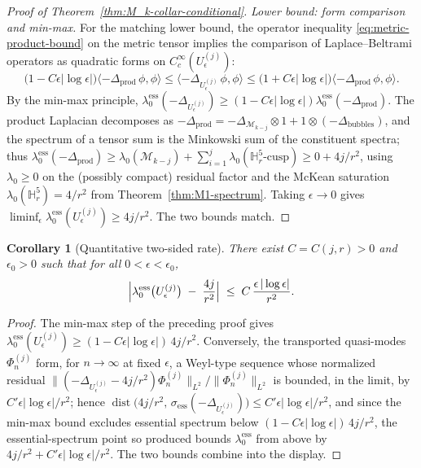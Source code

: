 \documentclass[11pt,letterpaper]{article}
\newtheorem{corollary}[theorem]{Corollary}
\theoremstyle{definition}
\newcommand{\bbH}{\mathbb{H}}
\newcommand{\cM}{\mathcal{M}}
\newcommand{\Lap}{\Delta}
\begin{document}
\begin{proof}[Proof of Theorem~\ref{thm:M_k-collar-conditional}]
\emph{Lower bound: form comparison and min-max.}
For the matching lower bound, the operator inequality \eqref{eq:metric-product-bound} on the metric tensor implies the comparison of Laplace--Beltrami operators as quadratic forms on $C_c^\infty(U_\epsilon^{(j)})$:
\[
\bigl(1 - C\epsilon|\log\epsilon|\bigr)\langle -\Lap_{\mathrm{prod}}\,\phi, \phi\rangle \le \langle -\Lap_{U_\epsilon^{(j)}}\,\phi, \phi\rangle \le \bigl(1 + C\epsilon|\log\epsilon|\bigr)\langle -\Lap_{\mathrm{prod}}\,\phi, \phi\rangle.
\]
By the min-max principle, $\lambda_0^{\mathrm{ess}}(-\Lap_{U_\epsilon^{(j)}}) \ge (1 - C\epsilon|\log\epsilon|)\lambda_0^{\mathrm{ess}}(-\Lap_{\mathrm{prod}})$. The product Laplacian decomposes as $-\Lap_{\mathrm{prod}} = -\Lap_{\cM_{k-j}} \otimes 1 + 1\otimes(-\Lap_{\mathrm{bubbles}})$, and the spectrum of a tensor sum is the Minkowski sum of the constituent spectra; thus $\lambda_0^{\mathrm{ess}}(-\Lap_{\mathrm{prod}}) \ge \lambda_0(\cM_{k-j}) + \sum_{i=1}^j \lambda_0(\bbH^5_r\text{-cusp}) \ge 0 + 4j/r^2$, using $\lambda_0 \ge 0$ on the (possibly compact) residual factor and the McKean saturation $\lambda_0(\bbH^5_r) = 4/r^2$ from Theorem~\ref{thm:M1-spectrum}. Taking $\epsilon \to 0$ gives $\liminf_\epsilon \lambda_0^{\mathrm{ess}}(U_\epsilon^{(j)}) \ge 4j/r^2$. The two bounds match.
\end{proof}

\begin{corollary}[Quantitative two-sided rate]\label{cor:rate}
There exist $C = C(j, r) > 0$ and $\epsilon_0 > 0$ such that for all $0 < \epsilon < \epsilon_0$,
\[
\Bigl|\lambda_0^{\mathrm{ess}}\bigl(U_\epsilon^{(j)}\bigr) \;-\; \frac{4j}{r^2}\Bigr| \;\le\; C\,\frac{\epsilon\,|\log\epsilon|}{r^2}.
\]
\end{corollary}

\begin{proof}
The min-max step of the preceding proof gives $\lambda_0^{\mathrm{ess}}(U_\epsilon^{(j)}) \ge (1 - C\epsilon|\log\epsilon|)\,4j/r^2$. Conversely, the transported quasi-modes $\Phi^{(j)}_n$ form, for $n \to \infty$ at fixed $\epsilon$, a Weyl-type sequence whose normalized residual $\|(-\Lap_{U_\epsilon^{(j)}} - 4j/r^2)\Phi^{(j)}_n\|_{L^2}/\|\Phi^{(j)}_n\|_{L^2}$ is bounded, in the limit, by $C'\epsilon|\log\epsilon|/r^2$; hence $\operatorname{dist}\bigl(4j/r^2,\,\sigma_{\mathrm{ess}}(-\Lap_{U_\epsilon^{(j)}})\bigr) \le C'\epsilon|\log\epsilon|/r^2$, and since the min-max bound excludes essential spectrum below $(1 - C\epsilon|\log\epsilon|)\,4j/r^2$, the essential-spectrum point so produced bounds $\lambda_0^{\mathrm{ess}}$ from above by $4j/r^2 + C'\epsilon|\log\epsilon|/r^2$. The two bounds combine into the display.
\end{proof}
\end{document}
